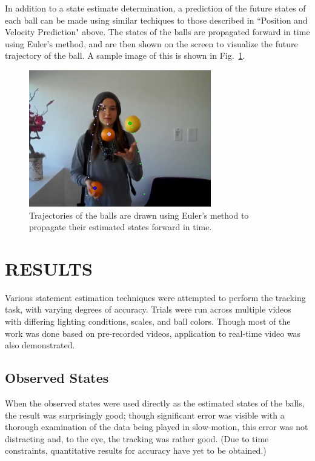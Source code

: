 \documentclass[letterpaper, 10 pt, conference]{ieeeconf}  %
\begin{document}
In addition to a state estimate determination, a prediction of the future states of each ball can be made using similar techiques to those described in ``Position and Velocity Prediction" above. The states of the balls are propagated forward in time using Euler's method, and are then shown on the screen to visualize the future trajectory of the ball. A sample image of this is shown in Fig.~\ref{fig:trajectories}.

\begin{figure}
\centering
    \includegraphics{trajectories.png}
    \caption{Trajectories of the balls are drawn using Euler's method to propagate their estimated states forward in time.}
    \label{fig:trajectories}
\end{figure}

\section{RESULTS}

Various statement estimation techniques were attempted to perform the tracking task, with varying degrees of accuracy. Trials were run across multiple videos with differing lighting conditions, scales, and ball colors. Though most of the work was done based on pre-recorded videos, application to real-time video was also demonstrated.

\subsection{Observed States}

When the observed states were used directly as the estimated states of the balls, the result was surprisingly good; though significant error was visible with a thorough examination of the data being played in slow-motion, this error was not distracting and, to the eye, the tracking was rather good. (Due to time constraints, quantitative results for accuracy have yet to be obtained.)
\end{document}
